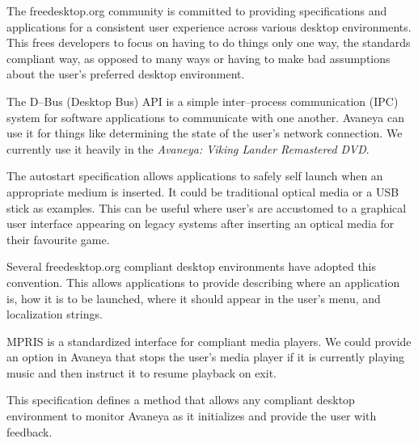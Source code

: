 

The freedesktop.org community is committed to providing specifications and applications for a consistent user experience across various desktop environments. This frees developers to focus on having to do things only one way, the standards compliant way, as opposed to many ways or having to make bad assumptions about the user's preferred desktop environment. 

\startitemize[4]

The D--Bus (Desktop Bus) API is a simple inter--process communication (IPC) system for software applications to communicate with one another. Avaneya can use it for things like determining the state of the user's network connection. We currently use it heavily in the {\it Avaneya: Viking Lander Remastered DVD}.


The autostart specification allows applications to safely self launch when an appropriate medium is inserted. It could be traditional optical media or a USB stick as examples. This can be useful where user's are accustomed to a graphical user interface appearing on legacy systems after inserting an optical media for their favourite game.


Several freedesktop.org compliant desktop environments have adopted this convention. This allows applications to provide  describing where an application is, how it is to be launched, where it should appear in the user's menu, and localization strings.


MPRIS is a standardized interface for compliant media players. We could provide an option in Avaneya that stops the user's media player if it is currently playing music and then instruct it to resume playback on exit.


This specification defines a method that allows any compliant desktop environment to monitor Avaneya as it initializes and provide the user with feedback.
\stopitemize

